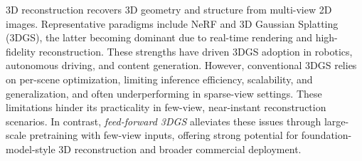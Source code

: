 \documentclass[runningheads]{llncs}
\begin{document}

3D reconstruction recovers 3D geometry and structure from multi-view 2D images. Representative paradigms include NeRF\cite{mildenhall2021nerf} and 3D Gaussian Splatting (3DGS)\cite{kerbl20233d}, the latter becoming dominant due to real-time rendering and high-fidelity reconstruction. These strengths have driven 3DGS adoption in robotics\cite{keetha2024splatam,lu2024manigaussian,matsuki2024gaussian,zou20253d}, autonomous driving\cite{hess2025splatad,khan2025autosplat,zhou2024drivinggaussian}, and content generation\cite{xiang2025native,xiang2025structured,hunyuan3d2025hunyuan3d,bahmani2025lyra,wu2025direct3d}. However, conventional 3DGS relies on per-scene optimization, limiting inference efficiency, scalability, and generalization, and often underperforming in sparse-view settings\cite{wu2025difix3d+}. These limitations hinder its practicality in few-view, near-instant reconstruction scenarios\cite{liu2025monosplat,charatan2024pixelsplat}. In contrast, \textit{feed-forward 3DGS}\cite{szymanowicz2024splatter,charatan2024pixelsplat} alleviates these issues through large-scale pretraining with few-view inputs\cite{zhang2025advances}, offering strong potential for foundation-model-style 3D reconstruction and broader commercial deployment.
\end{document}

